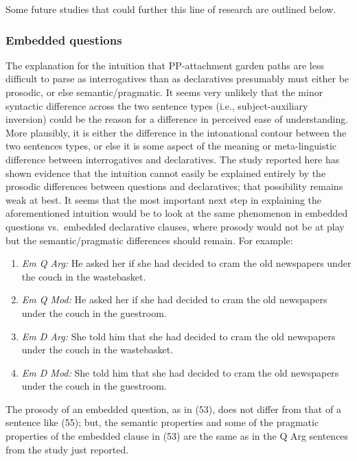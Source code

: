 \documentclass[11pt,oneside]{book}
\begin{document}
Some future studies that could further this line of research are outlined below.

\hypertarget{embedded-questions}{%
\subsubsection{Embedded questions}\label{embedded-questions}}

The explanation for the intuition that PP-attachment garden paths are less difficult to parse as interrogatives than as declaratives presumably must either be prosodic, or else semantic/pragmatic. It seems very unlikely that the minor syntactic difference across the two sentence types (i.e., subject-auxiliary inversion) could be the reason for a difference in perceived ease of understanding. More plausibly, it is either the difference in the intonational contour between the two sentences types, or else it is some aspect of the meaning or meta-linguistic difference between interrogatives and declaratives. The study reported here has shown evidence that the intuition cannot easily be explained entirely by the prosodic differences between questions and declaratives; that possibility remains weak at best. It seems that the most important next step in explaining the aforementioned intuition would be to look at the same phenomenon in embedded questions vs.~embedded declarative clauses, where prosody would not be at play but the semantic/pragmatic differences should remain. For example:

\begin{enumerate}
\def\labelenumi{(\arabic{enumi})}
\setcounter{enumi}{52}
\item
  \emph{Em Q Arg:} He asked her if she had decided to cram the old newspapers under the couch in the wastebasket.
\item
  \emph{Em Q Mod:} He asked her if she had decided to cram the old newspapers under the couch in the guestroom.
\item
  \emph{Em D Arg:} She told him that she had decided to cram the old newspapers under the couch in the wastebasket.
\item
  \emph{Em D Mod:} She told him that she had decided to cram the old newspapers under the couch in the guestroom.
\end{enumerate}

The prosody of an embedded question, as in (53), does not differ from that of a sentence like (55); but, the semantic properties and some of the pragmatic properties of the embedded clause in (53) are the same as in the Q Arg sentences from the study just reported.
\end{document}
